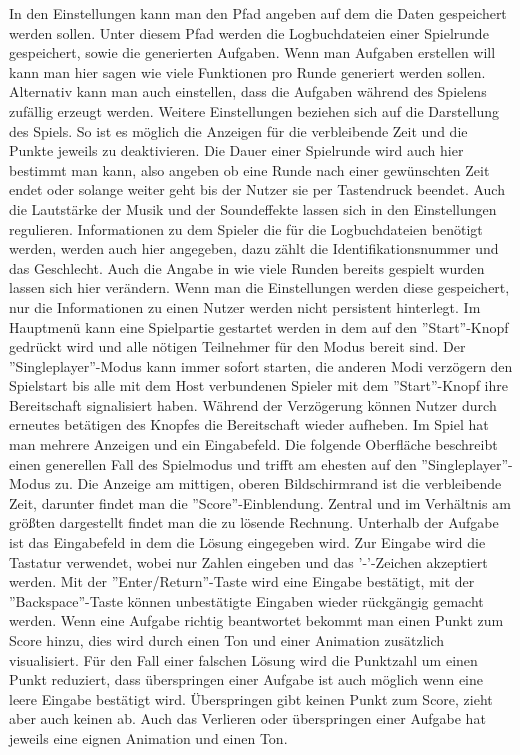In den Einstellungen kann man den Pfad angeben auf dem die Daten gespeichert werden sollen. Unter diesem Pfad werden die Logbuchdateien einer Spielrunde gespeichert, sowie die generierten Aufgaben. Wenn man Aufgaben erstellen will kann man hier sagen wie viele Funktionen pro Runde generiert werden sollen. Alternativ kann man auch einstellen, dass die Aufgaben während des Spielens zufällig erzeugt werden. Weitere Einstellungen beziehen sich auf die Darstellung des Spiels. So ist es möglich die Anzeigen für die verbleibende Zeit und die Punkte jeweils zu deaktivieren. Die Dauer einer Spielrunde wird auch hier bestimmt man kann, also angeben ob eine Runde nach einer gewünschten Zeit endet oder solange weiter geht bis der Nutzer sie per Tastendruck beendet. Auch die Lautstärke der Musik und der Soundeffekte lassen sich in den Einstellungen regulieren. Informationen zu dem Spieler die für die Logbuchdateien benötigt werden, werden auch hier angegeben, dazu zählt die Identifikationsnummer und das Geschlecht. Auch die Angabe in wie viele Runden bereits gespielt wurden lassen sich hier verändern. Wenn man die Einstellungen werden diese gespeichert, nur die Informationen zu einen Nutzer werden nicht persistent hinterlegt.\newline
Im Hauptmenü kann eine Spielpartie gestartet werden in dem auf den  ''Start''-Knopf gedrückt wird und alle nötigen Teilnehmer für den Modus bereit sind. Der ''Singleplayer''-Modus kann immer sofort starten, die anderen Modi verzögern den Spielstart bis alle mit dem Host verbundenen Spieler mit dem ''Start''-Knopf ihre Bereitschaft signalisiert haben. Während der Verzögerung können Nutzer durch erneutes betätigen des Knopfes die Bereitschaft wieder aufheben.\newline
Im Spiel hat man mehrere Anzeigen und ein Eingabefeld. Die folgende Oberfläche beschreibt einen generellen Fall des Spielmodus und trifft am ehesten auf den ''Singleplayer''-Modus zu. Die Anzeige am mittigen, oberen Bildschirmrand ist die verbleibende Zeit, darunter findet man die ''Score''-Einblendung. Zentral und im Verhältnis am größten dargestellt findet man die zu lösende Rechnung. Unterhalb der Aufgabe ist das Eingabefeld in dem die Lösung eingegeben wird. Zur Eingabe wird die Tastatur verwendet, wobei nur Zahlen eingeben und das '-'-Zeichen akzeptiert werden. Mit der ''Enter/Return''-Taste wird eine Eingabe bestätigt, mit der ''Backspace''-Taste können unbestätigte Eingaben wieder rückgängig gemacht werden. Wenn eine Aufgabe richtig beantwortet bekommt man einen Punkt zum Score hinzu, dies wird durch einen Ton und einer Animation zusätzlich visualisiert. Für den Fall einer falschen Lösung wird die Punktzahl um einen Punkt reduziert, dass überspringen einer Aufgabe ist auch möglich wenn eine leere Eingabe bestätigt wird. Überspringen gibt keinen Punkt zum Score, zieht aber auch keinen ab. Auch das Verlieren oder überspringen einer Aufgabe hat jeweils eine eignen Animation und einen Ton.

